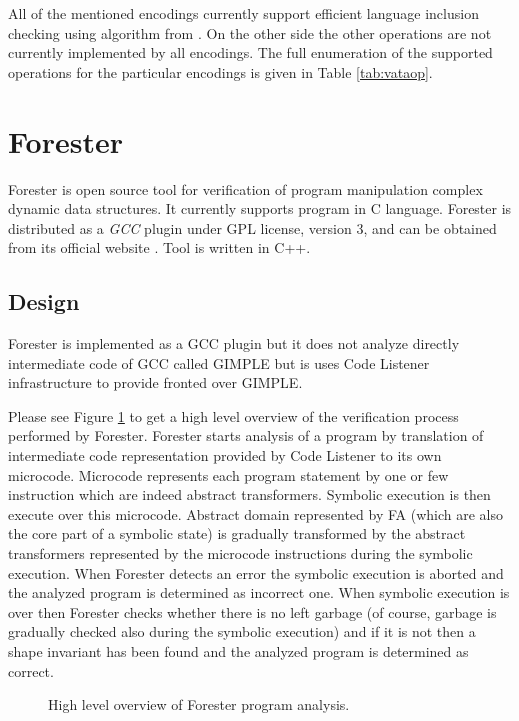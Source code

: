 All of the mentioned encodings currently support efficient language inclusion checking using algorithm
from \cite{tacas10}.
On the other side the other operations are not currently implemented by all encodings.
The full enumeration of the supported operations for the particular encodings is given in Table \ref{tab:vataop}.



\section{Forester}
\label{sec:FA}

Forester is open source tool for verification of program manipulation complex dynamic data structures.
It currently supports program in C language.
Forester is distributed as a \emph{GCC} plugin under GPL license, version 3, and can be obtained from its official website \cite{www:forester}.
Tool is written in C++.

\subsection{Design}

Forester is implemented as a GCC plugin but it does not analyze directly intermediate code of GCC called GIMPLE but is
uses Code Listener infrastructure \cite{cl11} to provide fronted over GIMPLE.

Please see Figure \ref{fig:fa_exec} to get a high level overview of the verification process performed by Forester. 
Forester starts analysis of a program by translation of intermediate code representation provided by Code Listener
to its own microcode.
Microcode represents each program statement by one or few instruction which are indeed abstract transformers.
Symbolic execution is then execute over this microcode.
Abstract domain represented by FA (which are also the core part of a symbolic state) is gradually transformed by the abstract transformers
represented by the microcode instructions during the symbolic execution.
When Forester detects an error the symbolic execution is aborted and the analyzed program is determined as incorrect one.
When symbolic execution is over then Forester checks whether there is no left garbage (of course, garbage is gradually checked also during the symbolic execution)
and if it is not then a shape invariant has been found and the analyzed program is determined as correct.

\begin{figure}[bt]
	\begin{center}
		
	\end{center}
	\caption{High level overview of Forester program analysis.}
	\label{fig:fa_exec}
\end{figure}

